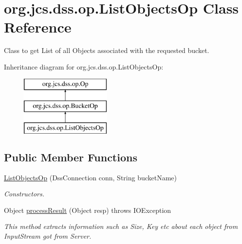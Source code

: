 \hypertarget{classorg_1_1jcs_1_1dss_1_1op_1_1ListObjectsOp}{}\section{org.\+jcs.\+dss.\+op.\+List\+Objects\+Op Class Reference}
\label{classorg_1_1jcs_1_1dss_1_1op_1_1ListObjectsOp}


Class to get List of all Objects associated with the requested bucket.  


Inheritance diagram for org.\+jcs.\+dss.\+op.\+List\+Objects\+Op\+:\begin{figure}[H]
\begin{center}
\leavevmode
\includegraphics[height=3.000000cm]{classorg_1_1jcs_1_1dss_1_1op_1_1ListObjectsOp}
\end{center}
\end{figure}
\subsection*{Public Member Functions}
\begin{DoxyCompactItemize}
\item 
\hyperlink{classorg_1_1jcs_1_1dss_1_1op_1_1ListObjectsOp_ae1f56ad3eedea91db238576334238dc6}{List\+Objects\+Op} (Dss\+Connection conn, String bucket\+Name)\hypertarget{classorg_1_1jcs_1_1dss_1_1op_1_1ListObjectsOp_ae1f56ad3eedea91db238576334238dc6}{}\label{classorg_1_1jcs_1_1dss_1_1op_1_1ListObjectsOp_ae1f56ad3eedea91db238576334238dc6}

\begin{DoxyCompactList}\small\item\em Constructors. \end{DoxyCompactList}\item 
Object \hyperlink{classorg_1_1jcs_1_1dss_1_1op_1_1ListObjectsOp_a78c2014b20163ca5cd5dfd47c4b181f3}{process\+Result} (Object resp)  throws I\+O\+Exception
\begin{DoxyCompactList}\small\item\em This method extracts information such as Size, Key etc about each object from Input\+Stream got from Server. \end{DoxyCompactList}\end{DoxyCompactItemize}
